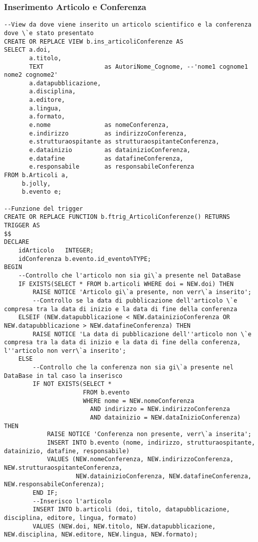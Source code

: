 \subsubsection{Inserimento Articolo e Conferenza}
\begin{lstlisting}
--View da dove viene inserito un articolo scientifico e la conferenza dove \`e stato presentato
CREATE OR REPLACE VIEW b.ins_articoliConferenze AS
SELECT a.doi,
       a.titolo,
       TEXT                 as AutoriNome_Cognome, --'nome1 cognome1 nome2 cognome2'
       a.datapubblicazione,
       a.disciplina,
       a.editore,
       a.lingua,
       a.formato,
       e.nome               as nomeConferenza,
       e.indirizzo          as indirizzoConferenza,
       e.strutturaospitante as strutturaospitanteConferenza,
       e.datainizio         as datainizioConferenza,
       e.datafine           as datafineConferenza,
       e.responsabile       as responsabileConferenza
FROM b.Articoli a,
     b.jolly,
     b.evento e;

--Funzione del trigger
CREATE OR REPLACE FUNCTION b.ftrig_ArticoliConferenze() RETURNS TRIGGER AS
$$
DECLARE
    idArticolo   INTEGER;
    idConferenza b.evento.id_evento%TYPE;
BEGIN
    --Controllo che l'articolo non sia gi\`a presente nel DataBase
    IF EXISTS(SELECT * FROM b.articoli WHERE doi = NEW.doi) THEN
        RAISE NOTICE 'Articolo gi\`a presente, non verr\`a inserito';
        --Controllo se la data di pubblicazione dell'articolo \`e compresa tra la data di inizio e la data di fine della conferenza
    ELSEIF (NEW.datapubblicazione < NEW.datainizioConferenza OR NEW.datapubblicazione > NEW.datafineConferenza) THEN
        RAISE NOTICE 'La data di pubblicazione dell''articolo non \`e compresa tra la data di inizio e la data di fine della conferenza, l''articolo non verr\`a inserito';
    ELSE
        --Controllo che la conferenza non sia gi\`a presente nel DataBase in tal caso la inserisco
        IF NOT EXISTS(SELECT *
                      FROM b.evento
                      WHERE nome = NEW.nomeConferenza
                        AND indirizzo = NEW.indirizzoConferenza
                        AND datainizio = NEW.dataInizioConferenza) THEN
            RAISE NOTICE 'Conferenza non presente, verr\`a inserita';
            INSERT INTO b.evento (nome, indirizzo, strutturaospitante, datainizio, datafine, responsabile)
            VALUES (NEW.nomeConferenza, NEW.indirizzoConferenza, NEW.strutturaospitanteConferenza,
                    NEW.datainizioConferenza, NEW.datafineConferenza, NEW.responsabileConferenza);
        END IF;
        --Inserisco l'articolo
        INSERT INTO b.articoli (doi, titolo, datapubblicazione, disciplina, editore, lingua, formato)
        VALUES (NEW.doi, NEW.titolo, NEW.datapubblicazione, NEW.disciplina, NEW.editore, NEW.lingua, NEW.formato);


\end{lstlisting}
